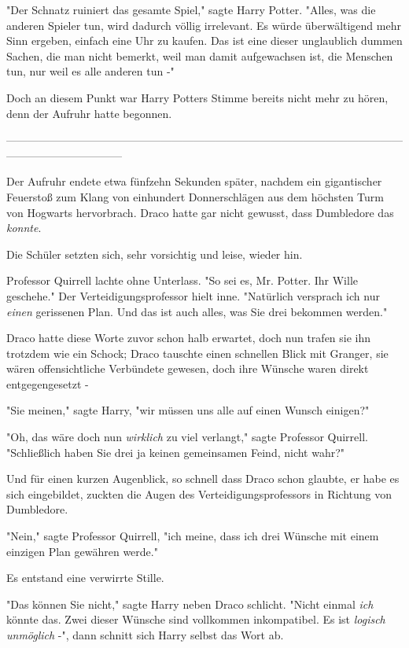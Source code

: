 {"Der Schnatz ruiniert das gesamte Spiel," sagte Harry Potter. "Alles, was die anderen Spieler tun, wird dadurch völlig irrelevant. Es würde überwältigend mehr Sinn ergeben, einfach eine Uhr zu kaufen. Das ist eine dieser unglaublich dummen Sachen, die man nicht bemerkt, weil man damit aufgewachsen ist, die Menschen tun, nur weil es alle anderen tun -"

Doch an diesem Punkt war Harry Potters Stimme bereits nicht mehr zu hören, denn der Aufruhr hatte begonnen.

--------------------------------------------------------------------------------------------------------------------------------------------

Der Aufruhr endete etwa fünfzehn Sekunden später, nachdem ein gigantischer Feuerstoß zum Klang von einhundert Donnerschlägen aus dem höchsten Turm von Hogwarts hervorbrach. Draco hatte gar nicht gewusst, dass Dumbledore das \emph{konnte}.

Die Schüler setzten sich, sehr vorsichtig und leise, wieder hin.

Professor Quirrell lachte ohne Unterlass. "So sei es, Mr. Potter. Ihr Wille geschehe." Der Verteidigungsprofessor hielt inne. "Natürlich versprach ich nur \emph{einen} gerissenen Plan. Und das ist auch alles, was Sie drei bekommen werden."

Draco hatte diese Worte zuvor schon halb erwartet, doch nun trafen sie ihn trotzdem wie ein Schock; Draco tauschte einen schnellen Blick mit Granger, sie wären offensichtliche Verbündete gewesen, doch ihre Wünsche waren direkt entgegengesetzt -

"Sie meinen," sagte Harry, "wir müssen uns alle auf einen Wunsch einigen?"

"Oh, das wäre doch nun \emph{wirklich} zu viel verlangt," sagte Professor Quirrell. "Schließlich haben Sie drei ja keinen gemeinsamen Feind, nicht wahr?"

Und für einen kurzen Augenblick, so schnell dass Draco schon glaubte, er habe es sich eingebildet, zuckten die Augen des Verteidigungsprofessors in Richtung von Dumbledore.

"Nein," sagte Professor Quirrell, "ich meine, dass ich drei Wünsche mit einem einzigen Plan gewähren werde."

Es entstand eine verwirrte Stille.

"Das können Sie nicht," sagte Harry neben Draco schlicht. "Nicht einmal \emph{ich} könnte das. Zwei dieser Wünsche sind vollkommen inkompatibel. Es ist \emph{logisch unmöglich} -", dann schnitt sich Harry selbst das Wort ab.

}
